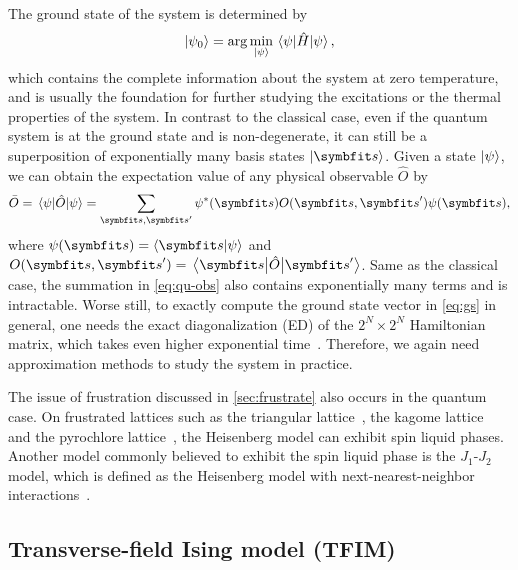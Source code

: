 The ground state of the system is determined by
\begin{equation}
\ket{\psi_0} = \arg\min_{\ket{\psi}} \ev{\hat{H}}{\psi},
\label{eq:gs}
\end{equation}
which contains the complete information about the system at zero temperature, and is usually the foundation for further studying the excitations or the thermal properties of the system. In contrast to the classical case, even if the quantum system is at the ground state and is non-degenerate, it can still be a superposition of exponentially many basis states $\ket{\vs}$. Given a state $\ket{\psi}$, we can obtain the expectation value of any physical observable $\hat{O}$ by
\begin{equation}
\bar{O} = \ev{\hat{O}}{\psi} = \sum_{\vs, \vs'} \psi^*(\vs) O(\vs, \vs') \psi(\vs),
\label{eq:qu-obs}
\end{equation}
where $\psi(\vs) = \ip{\vs}{\psi}$ and $O(\vs, \vs') = \mel{\vs}{\hat{O}}{\vs'}$. Same as the classical case, the summation in \cref{eq:qu-obs} also contains exponentially many terms and is intractable. Worse still, to exactly compute the ground state vector in \cref{eq:gs} in general, one needs the exact diagonalization (ED) of the $2^N \times 2^N$ Hamiltonian matrix, which takes even higher exponential time~\cite{weisse2008exact}. Therefore, we again need approximation methods to study the system in practice.

The issue of frustration discussed in \cref{sec:frustrate} also occurs in the quantum case. On frustrated lattices such as the triangular lattice~\cite{li2015rare}, the kagome lattice~\cite{norman2016colloquium} and the pyrochlore lattice~\cite{moessner1998properties}, the Heisenberg model can exhibit spin liquid phases. Another model commonly believed to exhibit the spin liquid phase is the $J_1$-$J_2$ model, which is defined as the Heisenberg model with next-nearest-neighbor interactions~\cite{dagotto1989phase, schulz1996magnetic, hu2013direct, liu2018gapless}.


\subsection{Transverse-field Ising model (TFIM)}
\label{sec:qu-ising}

